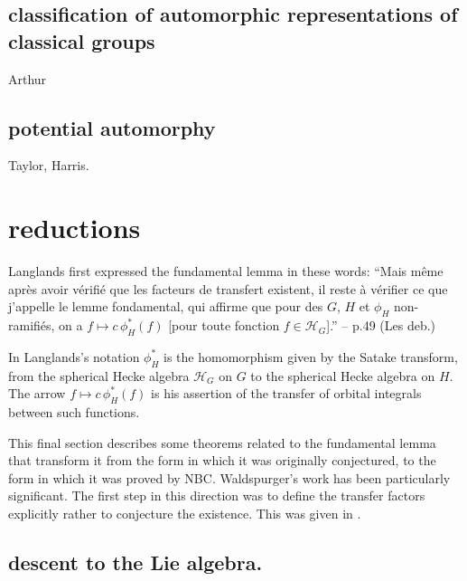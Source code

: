 \documentclass[brochure,english,12pt]{bourbaki}
\begin{document}

\subsection{classification of automorphic representations of classical groups}

Arthur

\subsection{potential automorphy}

Taylor, Harris.






\section{reductions}

Langlands first expressed the fundamental lemma in these words:
``Mais m\^eme apr\`es avoir
v\'erifi\'e que les facteurs de
transfert existent, il reste \`a v\'erifier ce que j'appelle le
lemme fondamental, qui affirme que pour des $G$, $H$ et $\phi_H$
non-ramifi\'es, on a $f\mapsto c\, \phi_H^*(f)$ [pour toute fonction $f\in {\mathcal H}_G$].''
 -- p.49 (Les deb.)  \cite[p.49]{Debuts}

In Langlands's notation $\phi_H^*$ is the homomorphism given by the
Satake transform, from the spherical Hecke algebra ${\mathcal H}_G$ on
$G$ to the spherical Hecke algebra on $H$.  The arrow $f\mapsto
c\,\phi_H^*(f)$ is his assertion of the transfer of orbital integrals
between such functions.

This final section describes some theorems related to the fundamental
lemma that transform it from the form in which it was originally
conjectured, to the form in which it was proved by NBC.  Waldspurger's
work has been particularly significant.  The first step in this
direction was to define the transfer factors explicitly rather to
conjecture the existence.  This was given in \cite{LS}.



\subsection{descent to the Lie algebra.}
\end{document}
